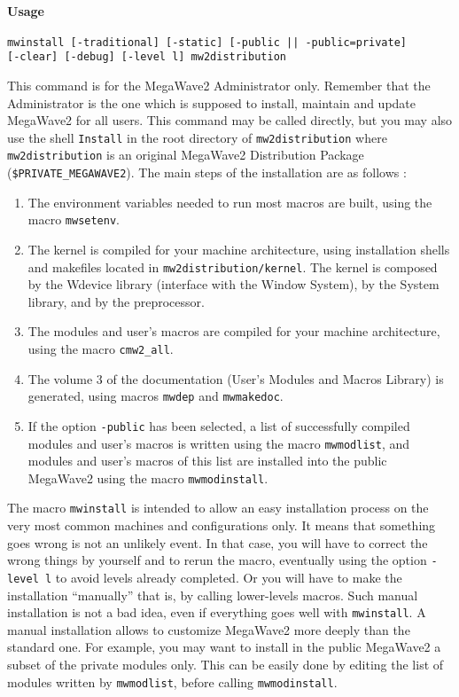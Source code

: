 \newpage

{\Large\bf Usage} \bigskip

\verb+mwinstall [-traditional] [-static] [-public || -public=private]+
\newline
\verb+          [-clear] [-debug] [-level l] mw2distribution+

\Next

\Description
This command is for the MegaWave2 Administrator only. Remember that the Administrator is the one
which is supposed to install, maintain and update MegaWave2 for all users.
This command may be called directly, but you may also use the shell \verb+Install+ in the root
directory of \verb+mw2distribution+ where \verb+mw2distribution+ is an original MegaWave2 
Distribution Package (\verb+$PRIVATE_MEGAWAVE2+). 
The main steps of the installation are as follows :
\begin{enumerate}
\item The environment variables needed to run most macros are built, using the macro \verb+mwsetenv+.
\item The kernel is compiled for your machine architecture, using installation shells and makefiles
located in \verb+mw2distribution/kernel+. The kernel is composed by the Wdevice library 
(interface with the Window System), by the System library, and by the preprocessor.
\item The modules and user's macros are compiled for your machine architecture, using the
macro \verb+cmw2_all+.
\item The volume 3 of the documentation (User's Modules and Macros Library) is generated, using
macros \verb+mwdep+ and \verb+mwmakedoc+.
\item If the option \verb+-public+ has been selected, a list of successfully compiled modules
and user's macros is written using the macro \verb+mwmodlist+, and modules and user's macros
of this list are installed into the public MegaWave2 using the macro \verb+mwmodinstall+.
\end{enumerate}

The macro \verb+mwinstall+ is intended to allow an easy installation process on the very most common
machines and configurations only. 
It means that something goes wrong is not an unlikely event. In that case, you will have to
correct the wrong things by yourself and to rerun the macro, eventually using the option 
\verb+-level l+ to avoid levels already completed. Or you will have to make the installation
``manually'' that is, by calling lower-levels macros. Such manual installation is not a bad
idea, even if everything goes well with \verb+mwinstall+. A manual installation allows to
customize MegaWave2 more deeply than the standard one. For example, you may want to install
in the public MegaWave2 a subset of the private modules only. This can be easily done by editing
the list of modules written by \verb+mwmodlist+, before calling \verb+mwmodinstall+.

